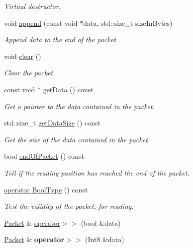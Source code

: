 \begin{DoxyCompactItemize}
\begin{DoxyCompactList}\small\item\em Virtual destructor. \end{DoxyCompactList}\item 
void \hyperlink{classsf_1_1_packet_a7dd6e429b87520008326c4d71f1cf011}{append} (const void $\ast$data, std\+::size\+\_\+t size\+In\+Bytes)
\begin{DoxyCompactList}\small\item\em Append data to the end of the packet. \end{DoxyCompactList}\item 
void \hyperlink{classsf_1_1_packet_a133ea8b8fe6e93c230f0d79f19a3bf0d}{clear} ()
\begin{DoxyCompactList}\small\item\em Clear the packet. \end{DoxyCompactList}\item 
const void $\ast$ \hyperlink{classsf_1_1_packet_a304ba9ec94c992710f4dfff879c6340e}{get\+Data} () const 
\begin{DoxyCompactList}\small\item\em Get a pointer to the data contained in the packet. \end{DoxyCompactList}\item 
std\+::size\+\_\+t \hyperlink{classsf_1_1_packet_a004b62aa5bafa69df8917171a3fe1fa0}{get\+Data\+Size} () const 
\begin{DoxyCompactList}\small\item\em Get the size of the data contained in the packet. \end{DoxyCompactList}\item 
bool \hyperlink{classsf_1_1_packet_aee3adfca6303f1e6bde3c62be392b945}{end\+Of\+Packet} () const 
\begin{DoxyCompactList}\small\item\em Tell if the reading position has reached the end of the packet. \end{DoxyCompactList}\item 
\hyperlink{classsf_1_1_packet_addcb990cde37859c748273d9de55e628}{operator Bool\+Type} () const 
\begin{DoxyCompactList}\small\item\em Test the validity of the packet, for reading. \end{DoxyCompactList}\item 
\hyperlink{classsf_1_1_packet}{Packet} \& \hyperlink{classsf_1_1_packet_af8e26c63ba9bdccd262565ff0d3eeba2}{operator$>$$>$} (bool \&data)
\item 
\hypertarget{classsf_1_1_packet_a70fd5abb9095b5335b79c0cefd17b222}{\hyperlink{classsf_1_1_packet}{Packet} \& {\bfseries operator$>$$>$} (Int8 \&data)}\label{classsf_1_1_packet_a70fd5abb9095b5335b79c0cefd17b222}


\end{DoxyCompactItemize}
